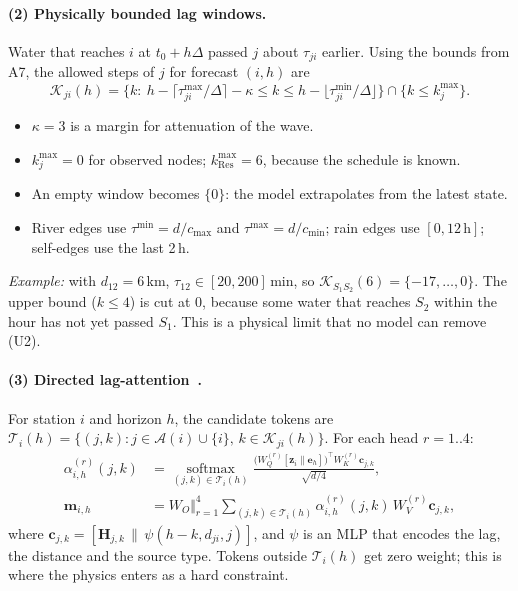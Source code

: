 \documentclass[11pt,a4paper]{article}
\newcommand{\A}{\mathcal{A}}
\newcommand{\K}{\mathcal{K}}
\newcommand{\Res}{\mathrm{Res}}
\begin{document}
\paragraph{(2) Physically bounded lag windows.} Water that reaches $i$ at
$t_0+h\Delta$ passed $j$ about $\tau_{ji}$ earlier. Using the bounds from A7,
the allowed steps of $j$ for forecast $(i,h)$ are
\begin{equation}
  \K_{ji}(h)=\big\{k:\ h-\lceil\tau^{\max}_{ji}/\Delta\rceil-\kappa \le k \le h-\lfloor\tau^{\min}_{ji}/\Delta\rfloor\big\}\cap\{k\le k^{\max}_j\}.
  \label{eq:window}
\end{equation}
\begin{itemize}
  \item $\kappa=3$ is a margin for attenuation of the wave.
  \item $k^{\max}_j=0$ for observed nodes; $k^{\max}_{\Res}=6$, because the
        schedule is known.
  \item An empty window becomes $\{0\}$: the model extrapolates from the latest
        state.
  \item River edges use $\tau^{\min}=d/c_{\max}$ and $\tau^{\max}=d/c_{\min}$;
        rain edges use $[0,12\,\mathrm{h}]$; self-edges use the last 2\,h.
\end{itemize}
\emph{Example:} with $d_{12}=6$\,km, $\tau_{12}\in[20,200]$\,min, so
$\K_{S_1S_2}(6)=\{-17,\dots,0\}$. The upper bound ($k\le4$) is cut at 0,
because some water that reaches $S_2$ within the hour has not yet passed $S_1$.
This is a physical limit that no model can remove (U2).

\paragraph{(3) Directed lag-attention~\cite{transformer}.} For station $i$ and
horizon $h$, the candidate tokens are
$\mathcal{T}_i(h)=\{(j,k):j\in\A(i)\cup\{i\},\,k\in\K_{ji}(h)\}$. For each head
$r=1..4$:
\begin{equation}
\begin{aligned}
  \alpha^{(r)}_{i,h}(j,k)&=\operatorname*{softmax}_{(j,k)\in\mathcal{T}_i(h)}
   \frac{\big(W^{(r)}_Q[\mathbf{z}_i\|\mathbf{e}_h]\big)^{\!\top} W^{(r)}_K\mathbf{c}_{j,k}}{\sqrt{d/4}},\\
  \mathbf{m}_{i,h}&=W_O\Big\Vert_{r=1}^{4}\sum_{(j,k)\in\mathcal{T}_i(h)}\alpha^{(r)}_{i,h}(j,k)\,W^{(r)}_V\mathbf{c}_{j,k},
\end{aligned}
  \label{eq:attn}
\end{equation}
where $\mathbf{c}_{j,k}=[\mathbf{H}_{j,k}\,\|\,\psi(h-k,d_{ji},j)]$, and $\psi$
is an MLP that encodes the lag, the distance and the source type. Tokens
outside $\mathcal{T}_i(h)$ get zero weight; this is where the physics enters
as a hard constraint.
\end{document}
